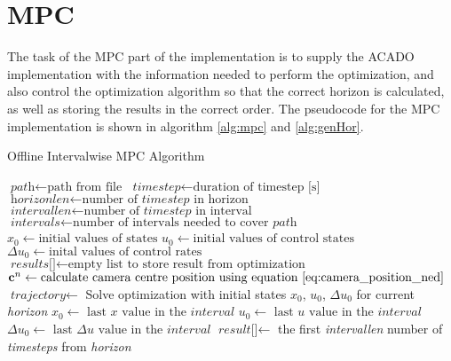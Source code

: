 \section{MPC}

The task of the MPC part of the implementation is to supply the ACADO implementation with the information needed to perform the optimization, and also control the optimization algorithm so that the correct horizon is calculated, as well as storing the results in the correct order. The pseudocode for the MPC implementation is shown in algorithm \ref{alg:mpc} and \ref{alg:genHor}.

\begin{algorithm}
\caption{Offline Intervalwise MPC Algorithm}
\label{alg:mpc}
\begin{algorithmic}
	\State $\textit{path} \gets \text{path from file}$
	\State $\textit{timestep} \gets \text{duration of timestep [s]}$
	\State $\textit{horizonlen} \gets \text{number of } \textit{timestep} \text{ in horizon}$
	\State $\textit{intervallen} \gets \text{number of } \textit{timestep} \text{ in interval}$
	\State $\textit{intervals} \gets \text{number of intervals needed to cover } \textit{path}$
	\State $\textit{x}_0 \gets \text{initial values of states}$
	\State $\textit{u}_0 \gets \text{initial values of control states}$
	\State $\Delta\textit{u}_0 \gets \text{inital values of control rates}$
	\State $\textit{results[]} \gets \text{empty list to store result from optimization}$
		\State $\mathbf{c}^n \gets \text{calculate camera centre position using equation } \ref{eq:camera_position_ned}$
		\State $\textit{trajectory} \gets$ 
		\State Solve optimization with initial states $x_0$, $u_0$, $\Delta u_0$ for current \textit{horizon}
		\State $\textit{x}_0 \gets \text{ last } \textit{x} \text{ value in the } \textit{interval}$
		\State $\textit{u}_0 \gets \text{ last } \textit{u} \text{ value in the } \textit{interval}$
		\State $\Delta\textit{u}_0 \gets \text{ last } \Delta\textit{u} \text{ value in the } \textit{interval}$
		\State $\textit{result[]} \gets$ the first \textit{intervallen} number of \textit{timesteps} from \textit{horizon}
	\EndFor
\EndProcedure
\end{algorithmic}
\end{algorithm}

